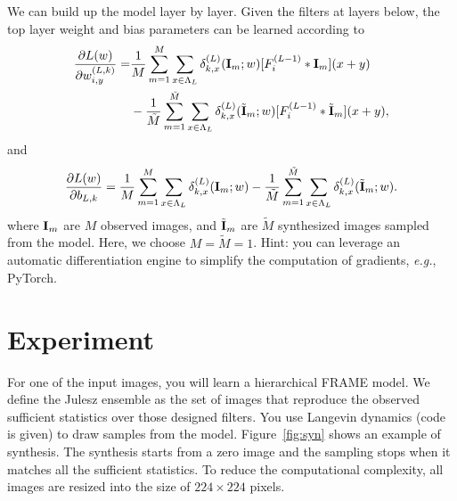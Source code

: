 \documentclass[11pt]{article}
\def\I{{\bf I}}
\begin{document}
We can build up the model layer by layer. 
Given the filters at layers below, the top layer weight and bias parameters can be learned according to 
\begin{equation}
\begin{aligned}
\frac{\partial L(w)}{\partial w_{i, y}^{(L, k)}} =& \frac{1}{M} \sum_{m=1}^{M}\sum_{x \in \Lambda_L} \delta^{(L)}_{k, x}(\I_m; w)  [F^{(L-1)}_{i} * \I_m](x+y) \\
&   -  \frac{1}{\tilde{M}} \sum_{m=1}^{\tilde{M}} \sum_{x \in \Lambda_L} \delta^{(L)}_{k, x}(\tilde{\I}_m; w)  [F^{(L-1)}_{i} * \tilde{\I}_m](x+y), \\
\end{aligned}
\label{eq:generativeGradient}
\end{equation}
and
\begin{equation}
\begin{aligned}
\frac{\partial L(w)}{\partial b_{L, k}} = \frac{1}{M} \sum_{m=1}^{M}\sum_{x \in \Lambda_L} \delta^{(L)}_{k, x}(\I_m; w) - \frac{1}{\tilde{M}} \sum_{m=1}^{\tilde{M}} \sum_{x  \in \Lambda_L} \delta^{(L)}_{k, x}(\tilde{\I}_m; w).
\end{aligned}
\label{eq:generativeGradient0}
\end{equation}
where $\I_m$ are $M$ observed images, and $\tilde{\I}_m$ are $\tilde{M}$ synthesized images sampled from the model. Here, we choose $M=\tilde{M}=1$. Hint: you can leverage an automatic differentiation engine to simplify the computation of gradients, \textit{e.g.}, PyTorch.

\section{Experiment}
For one of the input images, you will learn a hierarchical FRAME model. We define the Julesz ensemble as the set of images that reproduce the observed sufficient statistics over those designed filters. You use Langevin dynamics (code is given) to draw samples from the model. Figure~\ref{fig:syn} shows an example of synthesis. The synthesis starts from a zero image and the sampling stops when it matches all the sufficient statistics. To reduce the computational complexity, all images are resized into the size of $224\times 224$ pixels.
\end{document}
